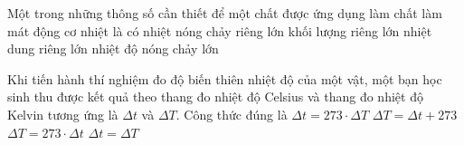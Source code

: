 	\begin{ex}%
		Một trong những thông số cần thiết để một chất được ứng dụng làm chất làm mát động cơ nhiệt là có
		\choice
		{nhiệt nóng chảy riêng lớn}
		{khối lượng riêng lớn}
		{\True nhiệt dung riêng lớn}
		{nhiệt độ nóng chảy lớn}
	\end{ex}

	\begin{ex}%
		Khi tiến hành thí nghiệm đo độ biến thiên nhiệt độ của một vật, một bạn học sinh thu được kết quả theo thang đo nhiệt độ Celsius và thang đo nhiệt độ Kelvin tương ứng là $\Delta t$ và $\Delta T$. Công thức đúng là
		\choice
		{$\Delta t=273\cdot\Delta T$}
		{$\Delta T=\Delta t+273$}
		{$\Delta T=273\cdot\Delta t$}
		{\True $\Delta t=\Delta T$}
	\end{ex}

